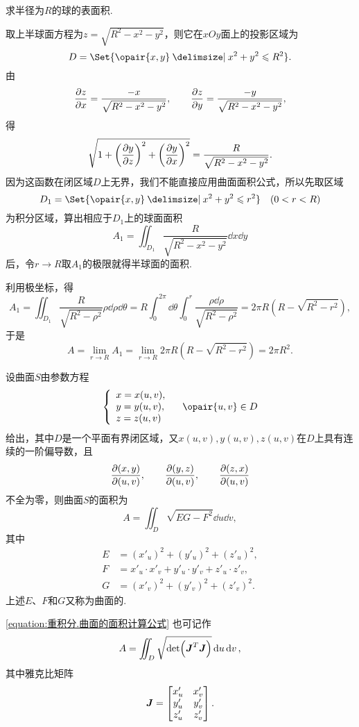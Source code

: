 \begin{example}
求半径为\(R\)的球的表面积.
\begin{solution}
\def\z{\sqrt{R^2-x^2-y^2}}
取上半球面方程为\(z = \z\)，则它在\(xOy\)面上的投影区域为\[
D = \Set{\opair{x,y} \given x^2+y^2 \leqslant R^2}.
\]由\[
\pdv{z}{x} = \frac{-x}{\z},
\qquad
\pdv{z}{y} = \frac{-y}{\z},
\]得\[
\sqrt{1 + \left(\pdv{y}{z}\right)^2 + \left(\pdv{y}{x}\right)^2}
= \frac{R}{\z}.
\]因为这函数在闭区域\(D\)上无界，我们不能直接应用曲面面积公式，所以先取区域\[
D_1 = \Set{\opair{x,y} \given x^2+y^2 \leqslant r^2}
\quad(0<r<R)
\]为积分区域，算出相应于\(D_1\)上的球面面积\[
A_1 = \iint_{D_1} \frac{R}{\z} \dd{x}\dd{y}
\]后，令\(r \to R\)取\(A_1\)的极限就得半球面的面积.

\def\zz{\sqrt{R^2-\rho^2}}
利用极坐标，得\[
A_1 = \iint_{D_1} \frac{R}{\zz} \rho\dd{\rho}\dd{\theta}
= R \int_0^{2\pi} \dd{\theta} \int_0^r \frac{\rho \dd{\rho}}{\zz}
= 2\pi R(R-\sqrt{R^2-r^2}),
\]
\def\l{\lim\limits_{r \to R}}
于是\begin{equation}
A = \l A_1
= \l 2\pi R(R-\sqrt{R^2-r^2})
= 2\pi R^2.
\end{equation}
\end{solution}
\end{example}

\begin{theorem}[利用曲面的参数方程求曲面的面积]
设曲面\(S\)由参数方程\[
\left\{ \begin{array}{l}
x = x(u,v), \\
y = y(u,v), \\
z = z(u,v) \\
\end{array} \right.
\quad
\opair{u,v} \in D
\]给出，其中\(D\)是一个平面有界闭区域，又\(x(u,v), y(u,v), z(u,v)\)在\(D\)上具有连续的一阶偏导数，且\[
\pdv{ (x,y) }{ (u,v) }, \qquad
\pdv{ (y,z) }{ (u,v) }, \qquad
\pdv{ (z,x) }{ (u,v) }
\]不全为零，则曲面\(S\)的面积为
\begin{equation}\label{equation:重积分.曲面的面积计算公式}
A = \iint_D \sqrt{E G - F^2} \dd{u}\dd{v},
\end{equation}其中\begin{align*}
E &= (x'_u)^2 + (y'_u)^2 + (z'_u)^2, \\
F &= x'_u \cdot x'_v + y'_u \cdot y'_v + z'_u \cdot z'_v, \\
G &= (x'_v)^2 + (y'_v)^2 + (z'_v)^2.
\end{align*}
\rm
上述\(E\)、\(F\)和\(G\)又称为曲面的.
\end{theorem}
\begingroup
\def\J{\mat{J}}%
\cref{equation:重积分.曲面的面积计算公式} 也可记作\[
A = \iint_D \sqrt{\det(\J^T \J)} \dd{u}\dd{v},
\]其中雅克比矩阵\[
\J = \begin{bmatrix}
x'_u & x'_v \\
y'_u & y'_v \\
z'_u & z'_v
\end{bmatrix}.
\]
\endgroup

